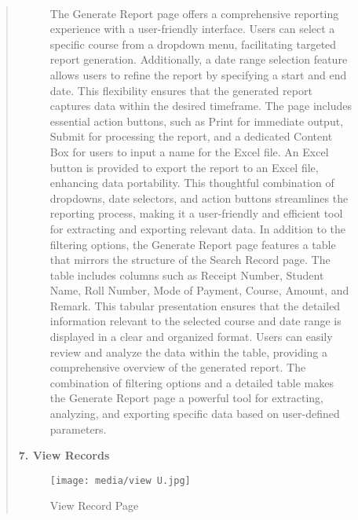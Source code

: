 \documentclass[12pt]{report}
\begin{document}
\begin{quote}
\begin{figure}[h]
			\paragraph{}
			\justifying
			The Generate Report page offers a comprehensive reporting experience with a user-friendly interface. Users can select a specific course from a dropdown menu, facilitating targeted report generation. Additionally, a date range selection feature allows users to refine the report by specifying a start and end date. This flexibility ensures that the generated report captures data within the desired timeframe. The page includes essential action buttons, such as Print for immediate output, Submit for processing the report, and a dedicated Content Box for users to input a name for the Excel file. An Excel button is provided to export the report to an Excel file, enhancing data portability. This thoughtful combination of dropdowns, date selectors, and action buttons streamlines the reporting process, making it a user-friendly and efficient tool for extracting and exporting relevant data.
			In addition to the filtering options, the Generate Report page features a table that mirrors the structure of the Search Record page. The table includes columns such as Receipt Number, Student Name, Roll Number, Mode of Payment, Course, Amount, and Remark. This tabular presentation ensures that the detailed information relevant to the selected course and date range is displayed in a clear and organized format. Users can easily review and analyze the data within the table, providing a comprehensive overview of the generated report. The combination of filtering options and a detailed table makes the Generate Report page a powerful tool for extracting, analyzing, and exporting specific data based on user-defined parameters.
			
		\end{figure}
		\clearpage
		
		\textbf{7. View Records}
		\begin{figure}[h]
			\centering
			\texttt{[image: media/view U.jpg]}\\
			\caption{View Record Page}
			\vspace{0.5cm}

\end{figure}
\end{quote}
\end{document}
